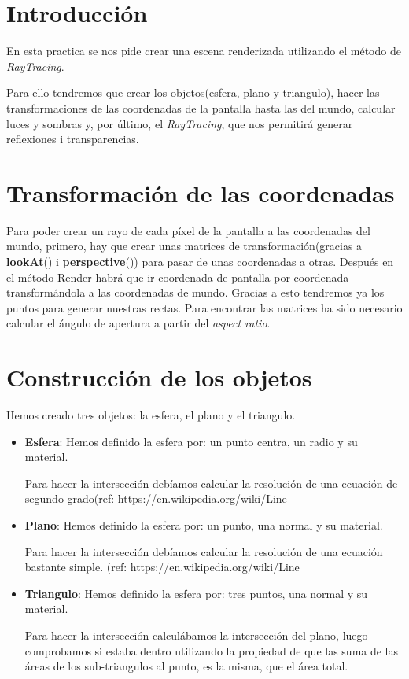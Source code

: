\tableofcontents

\newpage

\section{Introducción}
En esta practica se nos pide crear una escena renderizada utilizando el método de \emph{RayTracing}.

Para ello tendremos que crear los objetos(esfera, plano y triangulo), hacer las transformaciones de las coordenadas de la pantalla hasta las del mundo, calcular luces y sombras y, por último, el \emph{RayTracing}, que  nos permitirá generar reflexiones i transparencias.

\section{Transformación de las coordenadas}
Para poder crear un rayo de cada píxel de la pantalla a las coordenadas del mundo, primero, hay que crear unas matrices de transformación(gracias a \textbf{lookAt}() i \textbf{perspective}()) 	para pasar de unas coordenadas a otras. Después en el método Render habrá que ir coordenada de pantalla por coordenada transformándola a las coordenadas de mundo. Gracias a esto tendremos ya los puntos para generar nuestras rectas. 
Para encontrar las matrices ha sido necesario calcular el ángulo de apertura a partir del \textit{aspect ratio}.

\section{Construcción de los objetos}
Hemos creado tres objetos: la esfera, el plano y el triangulo.

\begin{itemize}


\item \textbf{Esfera}: Hemos definido la esfera por: un punto centra, un radio y su material.

Para hacer la intersección debíamos calcular la resolución de una ecuación de segundo grado(ref: https://en.wikipedia.org/wiki/Line%

\item \textbf{Plano}: Hemos definido la esfera por: un punto, una normal y su material.

Para hacer la intersección debíamos calcular la resolución de una ecuación  bastante simple.	(ref: https://en.wikipedia.org/wiki/Line%

\item \textbf{Triangulo}: Hemos definido la esfera por: tres puntos, una normal y su material.

Para hacer la intersección calculábamos la intersección del plano, luego comprobamos si estaba dentro utilizando la propiedad de que las suma de las áreas de los sub-triangulos al punto, es la misma, que el área total.

\end{itemize}



